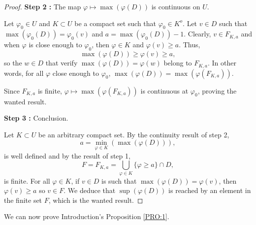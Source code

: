\documentclass{article}
\theoremstyle{remark}
\theoremstyle{definition}
\renewcommand{\geq}{\geqslant}
\newcommand{\inter}[1]{#1^o}
\begin{document}
\begin{proof}
\vspace{1mm}
\noindent\textbf{Step 2 :} The map $\varphi \mapsto \max(\varphi(D))$ is continuous on $U$.
\vspace{1mm}

Let $\varphi_0 \in U$ and $K \subset U$ be a compact set such that $\varphi_0 \in \inter{K}$. Let $v \in D$ such that $\max(\varphi_0(D)) = \varphi_0(v)$ and $a = \max(\varphi_0(D)) - 1$. Clearly, $v \in F_{K,a}$ and when $\varphi$ is close enough to $\varphi_0$, then $\varphi \in K$ and $\varphi(v) \geq a$. Thus,
$$
\max(\varphi(D)) \geq \varphi(v) \geq a,
$$
so the $w \in D$ that verify $\max(\varphi(D)) = \varphi(w)$ belong to $F_{K,a}$. In other words, for all $\varphi$ close enough to $\varphi_0$, $\max(\varphi(D)) = \max(\varphi(F_{K,a}))$.

Since $F_{K,a}$ is finite, $\varphi \mapsto \max(\varphi(F_{K,a}))$ is continuous at $\varphi_0$, proving the wanted result.

\vspace{1mm}
\noindent\textbf{Step 3 :} Conclusion.
\vspace{1mm}

Let $K \subset U$ be an arbitrary compact set. By the continuity result of step 2,
$$
a = \min_{\varphi \in K}(\max(\varphi(D))),
$$
is well defined and by the result of step 1,
$$
F = F_{K,a} = \bigcup_{\varphi \in K} \{\varphi \geq a\} \cap D,
$$
is finite. For all $\varphi \in K$, if $v \in D$ is such that $\max(\varphi(D)) = \varphi(v)$, then $\varphi(v) \geq a$ so $v \in F$. We deduce that $\sup(\varphi(D))$ is reached by an element in the finite set $F$, which is the wanted result.
\end{proof}

We can now prove Introduction's Proposition \ref{PRO:1}.
\end{document}
